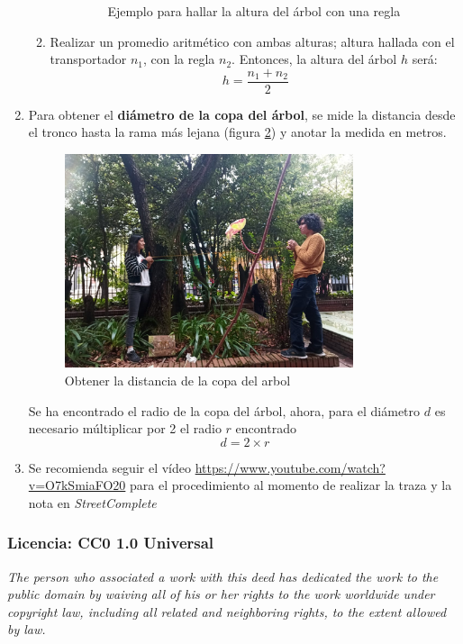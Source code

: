 \documentclass{article}
\begin{document}
\begin{enumerate}
\begin{enumerate}
\begin{itemize}
\begin{figure}[H]
                          \caption{Ejemplo para hallar la altura del árbol con una regla}
                          \label{fig:altura-regla}
                        \end{figure}
                \end{itemize}
          \item Realizar un promedio aritmético con ambas alturas; altura hallada con el transportador \(n_{1}\), con la regla \(n_{2}\). Entonces, la altura del árbol \(h\) será:
                \[
                h = \frac{n_{1} + n_{2}}{2}
                \]
        \end{enumerate}
  \item Para obtener el \textbf{diámetro de la copa del árbol}, se mide la distancia desde el tronco hasta la rama más lejana (figura \ref{fig:copa-arbol}) y anotar la medida en metros.
        \begin{figure}[H]
          \centering
          \includegraphics[width=0.8\textwidth]{img/Copa.jpg}
          \caption{Obtener la distancia de la copa del arbol}
          \label{fig:copa-arbol}
        \end{figure}

        Se ha encontrado el radio de la copa del árbol, ahora, para el diámetro \(d\) es necesario múltiplicar por 2 el radio \(r\) encontrado
        \[
        d = 2 \times r
        \]
  \item Se recomienda seguir el vídeo \url{https://www.youtube.com/watch?v=O7kSmiaFO20} para el procedimiento al momento de realizar la traza y la nota en \textit{StreetComplete}
\end{enumerate}

\subsubsection*{Licencia: CC0 1.0 Universal}

\textit{The person who associated a work with this deed has dedicated the work to the public domain by waiving all of his or her rights to the work worldwide under copyright law, including all related and neighboring rights, to the extent allowed by law.}
\end{document}
